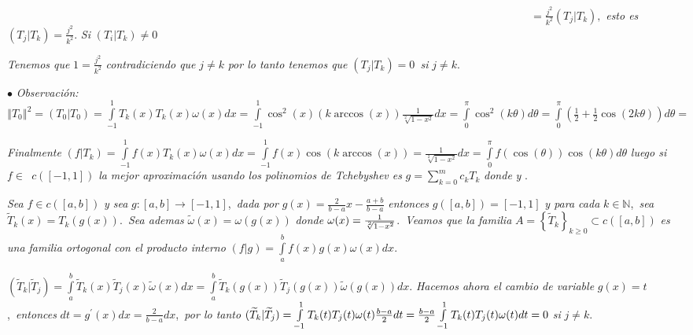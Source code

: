 \documentclass{article}
\begin{document}
\ \ \ \ \ \ \ \ \ \ \ \ \ \ \ \ \ \ \ \ \ \ \ \ \ \ \ \ \ \ \ \ \ \ \ \ \ \
\ \ \ \ \ \ \ \ \ \ \ \ \ \ \ \ \ \ \ \ \ \ \ \ \ \ \ \ \ \ \ \ \ \ \ \ \ \
\ \ \ \ \ \ \ \ \ \ \ \ \ \ \ \ \ \ \ $=\frac{j^{2}}{k^{2}}(T_{j}|T_{k}),$%
\textit{esto es }$(T_{j}|T_{k})=\frac{j^{2}}{k^{2}}$. \textit{Si }$%
(T_{i}|T_{k})\neq 0$

\textit{Tenemos que }$1=\frac{j^{2}}{k^{2}}$ \textit{contradiciendo que }$%
j\neq k$ \textit{por lo tanto tenemos que }$(T_{j}|T_{k})=0$\textit{\ si }$%
j\neq k$.

$\bullet $ \textit{Observaci\'{o}n: }$\left\Vert T_{0}\right\Vert
^{2}=(T_{0}|T_{0})=\int\limits_{-1}^{1}T_{k}(x)T_{k}(x)\omega
(x)dx=\int\limits_{-1}^{1}\cos ^{2}(x)(k\arccos (x))\frac{1}{\sqrt[2]{1-x^{2}%
}}dx=\int\limits_{0}^{\pi }\cos ^{2}(k\theta )d\theta =\int\limits_{0}^{\pi
}(\frac{1}{2}+\frac{1}{2}\cos (2k\theta ))d\theta =$\fbox{$\frac{\pi }{2}$}

\textit{Finalmente }$(f|T_{k})=\int\limits_{-1}^{1}f(x)T_{k}(x)\omega
(x)dx=\int\limits_{-1}^{1}f(x)\cos (k\arccos (x))=\frac{1}{\sqrt[2]{1-x^{2}}}%
dx=\int\limits_{0}^{\pi }f(\cos (\theta ))\cos (k\theta )d\theta $ \textit{%
luego si }$f\in $\textit{\ }$c(\left[ -1,1\right] )$ \textit{la mejor
aproximac\'{\i}\'{o}n usando los polinomios de Tchebyshev es }$%
g=\sum\limits_{k=0}^{m}c_{k}T_{k}$ \textit{donde }\fbox{$c_{0}=\frac{%
(f|T_{0})}{\pi }$} \textit{y }.

\textit{Sea }$f\in c(\left[ a,b\right] )$ \textit{y sea }$g:\left[ a,b\right]
\rightarrow \left[ -1,1\right] $,\textit{\ dada por }$g(x)=\frac{2}{b-a}x-%
\frac{a+b}{b-a}$ \textit{entonces }$g\left( \left[ a,b\right] \right) =\left[
-1,1\right] $ \textit{y para cada }$k\in 
\mathbb{N}
$,\textit{\ sea }$\widetilde{T}_{k}(x)=T_{k}(g(x))$.\textit{\ Sea ademas }$%
\widetilde{\omega }(x)=\omega (g(x))$ \textit{donde }$\omega (x)=\frac{1}{%
\sqrt[2]{1-x^{2}}}$.\textit{\ Veamos que la familia }$A=\left\{ \widetilde{T}%
_{k}\right\} _{k\geq 0}\subset c(\left[ a,b\right] )$ \textit{es una familia
ortogonal con el producto interno }$(f|g)=\int\limits_{a}^{b}f(x)g(x)\omega
(x)dx.$

$(\widetilde{T}_{k}|\widetilde{T}_{j})=\int\limits_{a}^{b}\widetilde{T}%
_{k}(x)\widetilde{T}_{j}(x)\widetilde{\omega }(x)dx=\int\limits_{a}^{b}%
\widetilde{T}_{k}(g(x))\widetilde{T}_{j}(g(x))\widetilde{\omega }(g(x))dx.$ 
\textit{Hacemos ahora el cambio de variable }$g(x)=t\,$,\textit{\ entonces }$%
dt=g^{\prime }(x)dx=\frac{2}{b-a}dx$,\textit{\ por lo tanto }$(\widetilde{T}%
_{k}|\widetilde{T}_{j})=\int\limits_{-1}^{1}T_{k}(t)T_{j}(t)\omega (t)\frac{%
b-a}{2}dt=\frac{b-a}{2}\int\limits_{-1}^{1}T_{k}(t)T_{j}(t)\omega (t)dt=0$ 
\textit{si }$j\neq k$.
\end{document}
